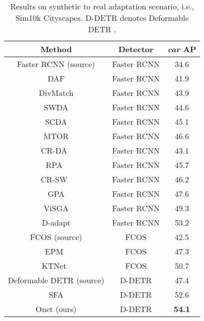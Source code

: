 \documentclass[sigconf]{acmart}
\begin{document}
 \begin{table}[t]
\centering
            \small
\caption{Results on synthetic to real adaptation scenario, i.e., Sim10k  Cityscapes. D-DETR denotes Deformable DETR \cite{zhu2020deformable}.} 
            \label{tab:sim10k}
            \setlength{\tabcolsep}{4mm}
            \begin{tabular}{c|c|c} 
                \toprule[1.0pt]
                Method & Detector & \emph{car} AP \\
                
                \hline
                Faster RCNN (source) & Faster RCNN & 34.6 \\
                DAF \cite{dafaster} & Faster RCNN & 41.9 \\
                DivMatch \cite{divmatch} & Faster RCNN & 43.9 \\
                SWDA \cite{strong-weak} & Faster RCNN & 44.6 \\
                SCDA \cite{scda} & Faster RCNN & 45.1 \\
                MTOR \cite{mtor} & Faster RCNN & 46.6 \\
                CR-DA~\cite{xu2020exploring} & Faster RCNN & 43.1 \\
                RPA~\cite{RPA} & Faster RCNN & 45.7 \\
                CR-SW~\cite{xu2020exploring} & Faster RCNN & 46.2 \\
                GPA  \cite{gpadet} & Faster RCNN & 47.6 \\
                ViSGA  \cite{ViSGA} & Faster RCNN & 49.3 \\
                D-adapt  \cite{jiang2021decoupled} & Faster RCNN & 53.2 \\
                \hline
                FCOS \cite{tian2019fcos} (source) & FCOS & 42.5 \\
                EPM~\cite{hsu2020every} & FCOS & 47.3 \\
                KTNet~\cite{KTNet} & FCOS & 50.7 \\
                \hline
                Deformable DETR (source) & D-DETR & 47.4  \\
                SFA \cite{wang2021exploring} & D-DETR & 52.6 \\
                Onet (ours) & D-DETR & \textbf{54.1} \\
                \bottomrule[1.0pt]
            \end{tabular}


\end{table}
\end{document}
